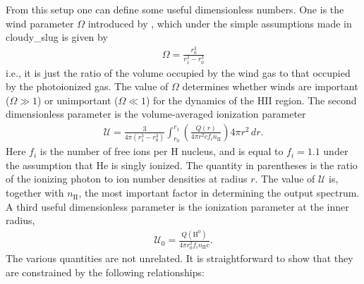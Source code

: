 \documentclass[letterpaper,10pt,english]{sphinxmanual}
\begin{document}
From this setup one can define some useful dimensionless numbers. One
is the wind parameter \(\Omega\) introduced by , which under the
simple assumptions made in cloudy\_slug is given by
\begin{equation*}
\begin{split}\Omega = \frac{r_0^3}{r_1^3-r_0^3}\end{split}
\end{equation*}
i.e., it is just the ratio of the volume occupied by the wind gas to
that occupied by the photoionized gas. The value of \(\Omega\)
determines whether winds are important (\(\Omega \gg 1\)) or
unimportant (\(\Omega \ll 1\)) for the dynamics of the HII
region. The second dimensionless parameter is the volume-averaged
ionization parameter
\begin{equation*}
\begin{split}\mathcal{U} = \frac{3}{4\pi (r_1^3-r_0^3)} \int_{r_0}^{r_1}
\left(\frac{Q(r)}{4\pi r^2 c f_i n_{\mathrm{II}}}\right)
4\pi r^2 \, dr.\end{split}
\end{equation*}
Here \(f_i\) is the number of free ions per H nucleus, and is
equal to \(f_i = 1.1\) under the assumption that He is singly
ionized. The quantity in parentheses is the ratio of the ionizing
photon to ion number densities at radius \(r\). The value of
\(\mathcal{U}\) is, together with \(n_{\mathrm{II}}\), the
most important factor in determining the output spectrum. A third
useful dimensionless parameter is the ionization parameter at the
inner radius,
\begin{equation*}
\begin{split}\mathcal{U}_0 = \frac{Q(\mathrm{H}^0)}
{4\pi r_0^2 f_i n_{\mathrm{II}} c}.\end{split}
\end{equation*}
The various quantities are not unrelated. It is straightforward to
show that they are constrained by the following relationships:
\end{document}
